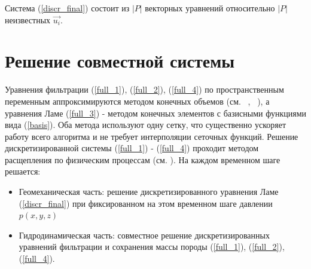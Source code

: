 \documentclass[11pt,twoside]{article}
\newcommand*\diff{\mathop{}\!\mathrm{d}}
\newcommand*\supp{\mathop{}\!\mathrm{Supp}}
\begin{document}
Система (\ref{discr_final}) состоит из $|P|$ векторных уравнений относительно $|P|$ неизвестных $\vec{u_i}$.




\section{Решение совместной системы}
Уравнения фильтрации (\ref{full_1}), (\ref{full_2}), (\ref{full_4}) по пространственным переменным аппроксимируются методом конечных объемов (см. ~\cite{Aziz}, ~\cite{Chen}), а уравнения Ламе (\ref{full_3}) - методом конечных элементов с базисными функциями вида (\ref{basis}). Оба метода используют одну сетку, что существенно ускоряет работу всего алгоритма и не требует интерполяции сеточных функций. Решение дискретизированной системы (\ref{full_1}) - (\ref{full_4}) проходит методом расщепления по физическим процессам  (см. \cite{Marchuk}).  На каждом временном шаге решается:
\begin{itemize}
\setlength\itemsep{0 em}
    \item {Геомеханическая часть: решение дискретизированного уравнения Ламе (\ref{discr_final}) при фиксированном на этом временном шаге давлении $p(x,y,z)$}
    \item {Гидродинамическая часть: совместное решение дискретизированных уравнений фильтрации и  сохранения массы породы (\ref{full_1}), (\ref{full_2}), (\ref{full_4}).} 
\end{itemize}
\end{document}
